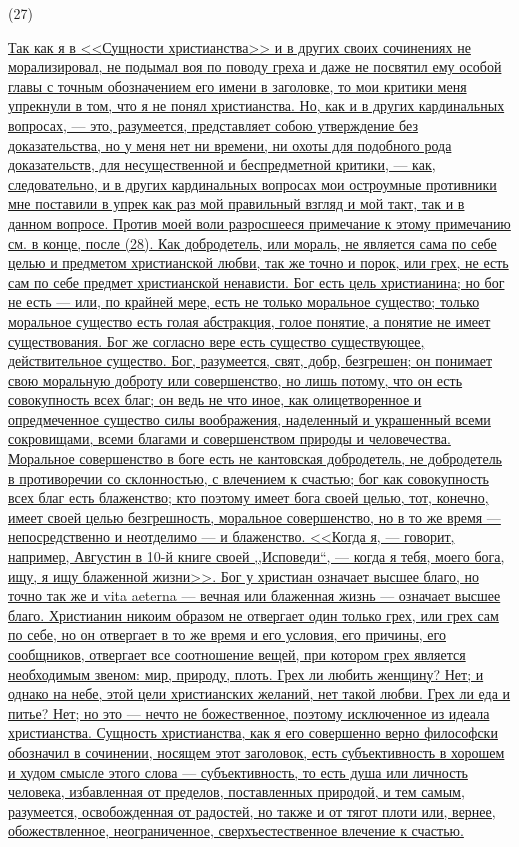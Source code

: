\documentclass[12pt]{article}
\begin{document}
\hypertarget{27}{(27)} \hyperlink{b27}{Так как я в <<Сущности христианства>> и в других своих сочинениях не морализировал, не подымал воя по поводу греха и даже не посвятил ему особой главы с точным обозначением его имени в заголовке, то мои критики меня упрекнули в том, что я не понял христианства. Но, как и в других кардинальных вопросах, --- это, разумеется, представляет собою утверждение без доказательства, но у меня нет ни времени, ни охоты для подобного рода доказательств, для несущественной и беспредметной критики, --- как, следовательно, и в других кардинальных вопросах мои остроумные противники мне поставили в упрек как раз мой правильный взгляд и мой такт, так и в данном вопросе. Против моей воли разросшееся примечание к этому примечанию см. в конце, после (28). Как добродетель, или мораль, не является сама по себе целью и предметом христианской любви, так же точно и порок, или грех, не есть сам по себе предмет христианской ненависти. Бог есть цель христианина; но бог не есть --- или, по крайней мере, есть не только моральное существо; только моральное существо есть голая абстракция, голое понятие, а понятие не имеет существования. Бог же согласно вере есть существо существующее, действительное существо. Бог, разумеется, свят, добр, безгрешен; он понимает свою моральную доброту или совершенство, но лишь потому, что он есть совокупность всех благ; он ведь не что иное, как олицетворенное и опредмеченное существо силы воображения, наделенный и украшенный всеми сокровищами, всеми благами и совершенством природы и человечества. Моральное совершенство в боге есть не кантовская добродетель, не добродетель в противоречии со склонностью, с влечением к счастью; бог как совокупность всех благ есть блаженство; кто поэтому имеет бога своей целью, тот, конечно, имеет своей целью безгрешность, моральное совершенство, но в то же время --- непосредственно и неотделимо --- и блаженство. <<Когда я, --- говорит, например, Августин в 10-й книге своей ,,Исповеди``, --- когда я тебя, моего бога, ищу, я ищу блаженной жизни>>. Бог у христиан означает высшее благо, но точно так же и vita aeterna --- вечная или блаженная жизнь --- означает высшее благо. Христианин никоим образом не отвергает один только грех, или грех сам по себе, но он отвергает в то же время и его условия, его причины, его сообщников, отвергает все соотношение вещей, при котором грех является необходимым звеном: мир, природу, плоть. Грех ли любить женщину? Нет; и однако на небе, этой цели христианских желаний, нет такой любви. Грех ли еда и питье? Нет; но это --- нечто не божественное, поэтому исключенное из идеала христианства. Сущность христианства, как я его совершенно верно философски обозначил в сочинении, носящем этот заголовок, есть субъективность в хорошем и худом смысле этого слова --- субъективность, то есть душа или личность человека, избавленная от пределов, поставленных природой, и тем самым, разумеется, освобожденная от радостей, но также и от тягот плоти или, вернее, обожествленное, неограниченное, сверхъестественное влечение к счастью.}
\end{document}

